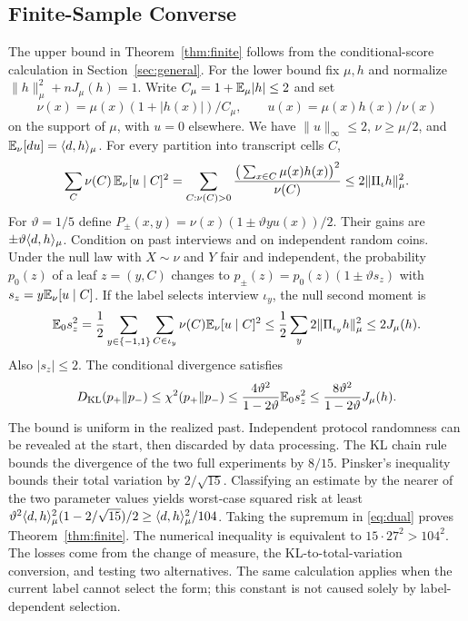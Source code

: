 \subsection{Finite-Sample Converse}
The upper bound in Theorem~\ref{thm:finite} follows from the conditional-score calculation in Section~\ref{sec:general}. For the lower bound fix $\mu,h$ and normalize $\|h\|_\mu^2+nJ_\mu(h)=1$. Write $C_\mu=1+\mathbb{E}_\mu|h|\le2$ and set
\[
 \nu(x)=\mu(x)(1+|h(x)|)/C_\mu,\qquad
 u(x)=\mu(x)h(x)/\nu(x)
\]
on the support of $\mu$, with $u=0$ elsewhere. We have $\|u\|_\infty\le2$, $\nu\ge\mu/2$, and $\mathbb{E}_\nu[du]=\langle d,h\rangle_\mu$. For every partition into transcript cells $C$,
\[
 \sum_C \nu(C)\,\mathbb{E}_\nu[u\mid C]^2
  =\sum_{C:\nu(C)>0}\frac{\big(\sum_{x\in C}\mu(x)h(x)\big)^2}{\nu(C)}
  \le 2\|\Pi_\iota h\|_\mu^2 .
\]
For $\vartheta=1/5$ define $P_\pm(x,y)=\nu(x)(1\pm \vartheta y u(x))/2$. Their gains are $\pm \vartheta\langle d,h\rangle_\mu$. Condition on past interviews and on independent random coins. Under the null law with $X\sim\nu$ and $Y$ fair and independent, the probability $p_0(z)$ of a leaf $z=(y,C)$ changes to $p_\pm(z)=p_0(z)(1\pm \vartheta s_z)$ with $s_z=y\mathbb{E}_\nu[u\mid C]$. If the label selects interview $\iota_y$, the null second moment is
\[
 \mathbb{E}_0s_z^2=\frac12\sum_{y\in\{-1,1\}}\sum_{C\in \iota_y}
       \nu(C)\mathbb{E}_\nu[u\mid C]^2
 \le\frac12\sum_y 2\|\Pi_{\iota_y}h\|_\mu^2\le2J_\mu(h).
\]
Also $|s_z|\le2$. The conditional divergence satisfies
\[
 D_{\mathrm{KL}}(p_+\Vert p_-)\le\chi^2(p_+\Vert p_-)
    \le \frac{4\vartheta^2}{1-2\vartheta}\mathbb{E}_0 s_z^2
    \le \frac{8\vartheta^2}{1-2\vartheta}J_\mu(h).
\]
The bound is uniform in the realized past. Independent protocol randomness can be revealed at the start, then discarded by data processing. The KL chain rule bounds the divergence of the two full experiments by $8/15$. Pinsker's inequality bounds their total variation by $2/\sqrt{15}$. Classifying an estimate by the nearer of the two parameter values yields worst-case squared risk at least $\vartheta^2\langle d,h\rangle_\mu^2(1-2/\sqrt{15})/2\ge\langle d,h\rangle_\mu^2/104$. Taking the supremum in \eqref{eq:dual} proves Theorem~\ref{thm:finite}. The numerical inequality is equivalent to $15\cdot27^2>104^2$. The losses come from the change of measure, the KL-to-total-variation conversion, and testing two alternatives. The same calculation applies when the current label cannot select the form; this constant is not caused solely by label-dependent selection.

